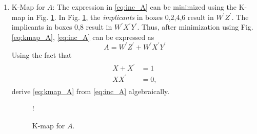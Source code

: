 \renewcommand{\theequation}{\theenumi}
\renewcommand{\thefigure}{\theenumi}
\begin{enumerate}[label=\thesection.\arabic*.,ref=\thesection.\theenumi]

\item K-Map for $A$: 
The expression in \eqref{eq:inc_A}  can be minimized using the K-map in Fig. \ref{fig:kmap_A}.
In Fig. \ref{fig:kmap_A},  the {\em implicants} in boxes 0,2,4,6 result in $W^{\prime}Z^{\prime}$.  The implicants in
boxes 0,8 result in $W^{\prime}X^{\prime}Y^{\prime}$.  Thus, after minimization using Fig. \ref{eq:kmap_A},  \eqref{eq:inc_A} can be expressed as
%
\begin{equation}
\label{eq:kmap_A}
A = W^{\prime}Z^{\prime}+W^{\prime}X^{\prime}Y^{\prime}
\end{equation}
%
Using the fact that
\begin{align}
\label{eq:inc_Boolean}
\begin{split}
X+X^{\prime} &= 1
\\
XX^{\prime} &= 0,
\end{split}
\end{align}
%
derive \eqref{eq:kmap_A} from \eqref{eq:inc_A} algebraically.
%
%
%
\begin{figure}[!h]
\resizebox {\columnwidth} {!} {

}
\caption{K-map for $A$.}
\label{fig:kmap_A}
\end{figure}


\end{enumerate}
